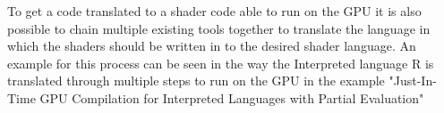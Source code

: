 To get a code translated to a shader code able to run on the GPU it is also possible to chain multiple existing tools together to translate the language in which the shaders should be written in to the desired shader language. An example for this process can be seen in the way the Interpreted language R is translated through multiple steps to run on the GPU in the example "Just-In-Time  GPU  Compilation  for Interpreted  Languages  with  Partial  Evaluation"